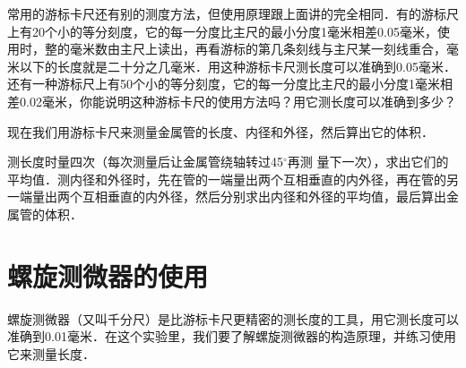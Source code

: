 常用的游标卡尺还有别的测度方法，但使用原理跟上面讲的完全相同．有的游标尺上有20个小的等分刻度，它的每一分度比主尺的最小分度1毫米相差0.05毫米，使用时，整的毫米数由主尺上读出，再看游标的第几条刻线与主尺某一刻线重合，毫米以下的长度就是二十分之几毫米．用这种游标卡尺测长度可以准确到0.05毫米．还有一种游标尺上有50个小的等分刻度，它的每一分度比主尺的最小分度1毫米相差0.02毫米，你能说明这种游标卡尺的使用方法吗？用它测长度可以准确到多少？

现在我们用游标卡尺来测量金属管的长度、内径和外径，然后算出它的体积．

测长度时量四次（每次测量后让金属管绕轴转过45$^\circ$再测
量下一次），求出它们的平均值．测内径和外径时，先在管的一端量出两个互相垂直的内外径，再在管的另一端量出两个互相垂直的内外径，然后分别求出内径和外径的平均值，最后算出金属管的体积．
\newpage
\section{螺旋测微器的使用}
螺旋测微器（又叫千分尺）是比游标卡尺更精密的测长度的工具，用它测长度可以准确到0.01毫米．在这个实验里，我们要了解螺旋测微器的构造原理，并练习使用它来测量长度．

